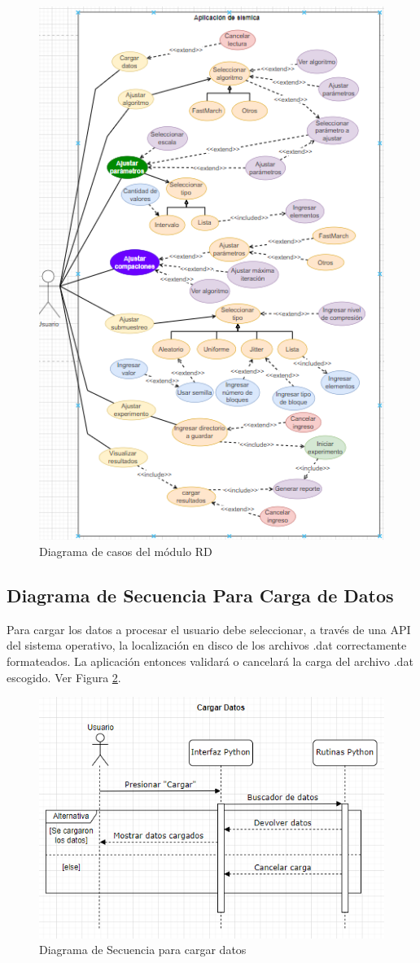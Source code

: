 \documentclass[12pt,twoside,letter]{ol-softwaremanual}
\begin{document}
\begin{figure}
	\centering
	\includegraphics[width=0.7\linewidth]{figures/screenshot010}
	\caption{Diagrama de casos del módulo RD}
	\label{fig:screenshot010}
\end{figure}


\subsection{Diagrama de Secuencia Para Carga de Datos}

Para cargar los datos a procesar el usuario debe seleccionar, a través de una API del sistema operativo, la localización en disco de los archivos .dat correctamente formateados. La aplicación entonces validará o cancelará la carga del archivo .dat escogido. Ver Figura \ref{fig:screenshot001}.

\begin{figure}
	\centering
	\includegraphics[width=0.7\linewidth]{figures/screenshot001}
	\caption{Diagrama de Secuencia para cargar datos}
	\label{fig:screenshot001}
\end{figure}
\end{document}
